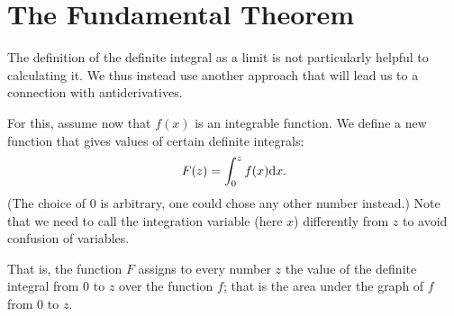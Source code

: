 \section{The Fundamental Theorem}

The definition of the definite integral as a limit is not particularly helpful to
calculating it. We thus instead use another approach that will lead us to a
connection with antiderivatives.

For this, assume now that $f(x)$ is an integrable function.
We define a new function that gives values of certain definite integrals:
\[
F(z)=\int_0^z f(x){\mbox{d}}x.
\]
(The choice of $0$ is arbitrary, one could chose any other number instead.)
Note that we need to call the integration variable (here $x$) differently from $z$
to avoid confusion of variables.

That is, the function $F$ assigns to every number $z$ the value of the definite
integral from $0$ to $z$ over the function $f$; that is the area under the graph
of $f$ from $0$ to $z$.

